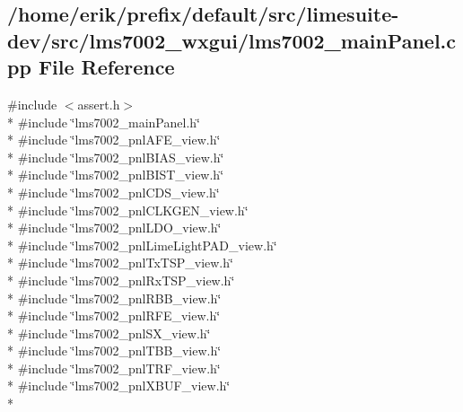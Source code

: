 \subsection{/home/erik/prefix/default/src/limesuite-\/dev/src/lms7002\+\_\+wxgui/lms7002\+\_\+main\+Panel.cpp File Reference}
\label{lms7002__mainPanel_8cpp}
{\ttfamily \#include $<$assert.\+h$>$}\\*
{\ttfamily \#include \char`\"{}lms7002\+\_\+main\+Panel.\+h\char`\"{}}\\*
{\ttfamily \#include \char`\"{}lms7002\+\_\+pnl\+A\+F\+E\+\_\+view.\+h\char`\"{}}\\*
{\ttfamily \#include \char`\"{}lms7002\+\_\+pnl\+B\+I\+A\+S\+\_\+view.\+h\char`\"{}}\\*
{\ttfamily \#include \char`\"{}lms7002\+\_\+pnl\+B\+I\+S\+T\+\_\+view.\+h\char`\"{}}\\*
{\ttfamily \#include \char`\"{}lms7002\+\_\+pnl\+C\+D\+S\+\_\+view.\+h\char`\"{}}\\*
{\ttfamily \#include \char`\"{}lms7002\+\_\+pnl\+C\+L\+K\+G\+E\+N\+\_\+view.\+h\char`\"{}}\\*
{\ttfamily \#include \char`\"{}lms7002\+\_\+pnl\+L\+D\+O\+\_\+view.\+h\char`\"{}}\\*
{\ttfamily \#include \char`\"{}lms7002\+\_\+pnl\+Lime\+Light\+P\+A\+D\+\_\+view.\+h\char`\"{}}\\*
{\ttfamily \#include \char`\"{}lms7002\+\_\+pnl\+Tx\+T\+S\+P\+\_\+view.\+h\char`\"{}}\\*
{\ttfamily \#include \char`\"{}lms7002\+\_\+pnl\+Rx\+T\+S\+P\+\_\+view.\+h\char`\"{}}\\*
{\ttfamily \#include \char`\"{}lms7002\+\_\+pnl\+R\+B\+B\+\_\+view.\+h\char`\"{}}\\*
{\ttfamily \#include \char`\"{}lms7002\+\_\+pnl\+R\+F\+E\+\_\+view.\+h\char`\"{}}\\*
{\ttfamily \#include \char`\"{}lms7002\+\_\+pnl\+S\+X\+\_\+view.\+h\char`\"{}}\\*
{\ttfamily \#include \char`\"{}lms7002\+\_\+pnl\+T\+B\+B\+\_\+view.\+h\char`\"{}}\\*
{\ttfamily \#include \char`\"{}lms7002\+\_\+pnl\+T\+R\+F\+\_\+view.\+h\char`\"{}}\\*
{\ttfamily \#include \char`\"{}lms7002\+\_\+pnl\+X\+B\+U\+F\+\_\+view.\+h\char`\"{}}\\*
